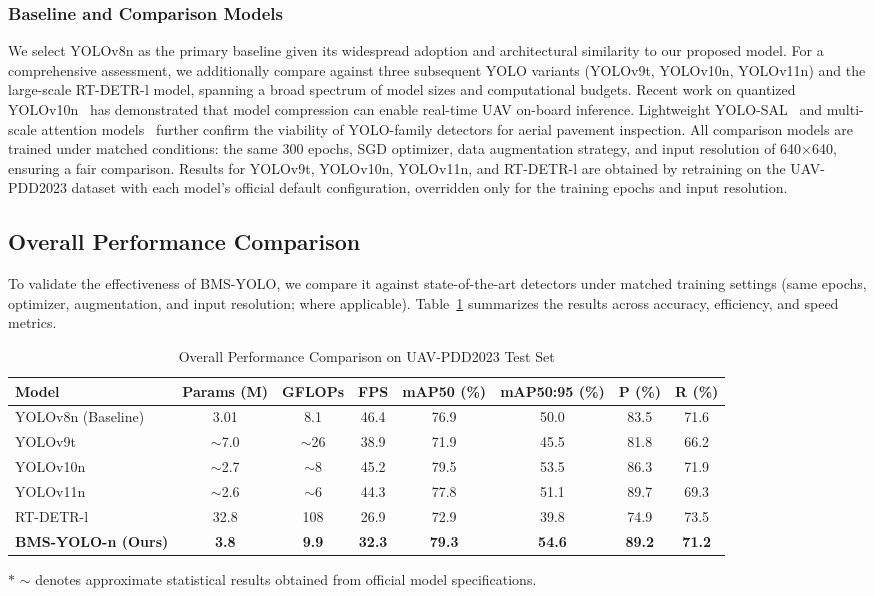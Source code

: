 \documentclass{ieeeaccess}
\begin{document}
\subsubsection{Baseline and Comparison Models}
We select YOLOv8n as the primary baseline given its widespread adoption and architectural similarity to our proposed model. For a comprehensive assessment, we additionally compare against three subsequent YOLO variants (YOLOv9t, YOLOv10n, YOLOv11n) and the large-scale RT-DETR-l model, spanning a broad spectrum of model sizes and computational budgets. Recent work on quantized YOLOv10n~\cite{ye2025yolov8nsbp} has demonstrated that model compression can enable real-time UAV on-board inference. Lightweight YOLO-SAL~\cite{li2024mlyolo} and multi-scale attention models~\cite{xu2025freqattention} further confirm the viability of YOLO-family detectors for aerial pavement inspection. All comparison models are trained under matched conditions: the same 300 epochs, SGD optimizer, data augmentation strategy, and input resolution of 640$\times$640, ensuring a fair comparison. Results for YOLOv9t, YOLOv10n, YOLOv11n, and RT-DETR-l are obtained by retraining on the UAV-PDD2023 dataset with each model's official default configuration, overridden only for the training epochs and input resolution.

\subsection{Overall Performance Comparison}

To validate the effectiveness of BMS-YOLO, we compare it against state-of-the-art detectors under matched training settings (same epochs, optimizer, augmentation, and input resolution; where applicable). Table~\ref{tab:overall} summarizes the results across accuracy, efficiency, and speed metrics.

\begin{table}[!t]
\caption{Overall Performance Comparison on UAV-PDD2023 Test Set}
\label{tab:overall}
\centering
\setlength{\tabcolsep}{3.5pt}
\begin{tabular}{lccccccc}
\toprule
Model & Params (M) & GFLOPs & FPS & mAP50 (\%) & mAP50:95 (\%) & P (\%) & R (\%) \\
\midrule
YOLOv8n (Baseline) & 3.01 & 8.1 & 46.4 & 76.9 & 50.0 & 83.5 & 71.6 \\
YOLOv9t  & $\sim$7.0 & $\sim$26 & 38.9 & 71.9 & 45.5 & 81.8 & 66.2 \\
YOLOv10n & $\sim$2.7 & $\sim$8  & 45.2 & 79.5 & 53.5 & 86.3 & 71.9 \\
YOLOv11n & $\sim$2.6 & $\sim$6  & 44.3 & 77.8 & 51.1 & 89.7 & 69.3 \\
RT-DETR-l & 32.8 & 108  & 26.9 & 72.9 & 39.8 & 74.9 & 73.5 \\
\midrule
\textbf{BMS-YOLO-n (Ours)} & \textbf{3.8} & \textbf{9.9} & \textbf{32.3} & \textbf{79.3} & \textbf{54.6} & \textbf{89.2} & \textbf{71.2} \\
\bottomrule
\end{tabular}
\parbox{\linewidth}{\footnotesize $\ast$ $\sim$ denotes approximate statistical results obtained from official model specifications.}
\end{table}
\end{document}

